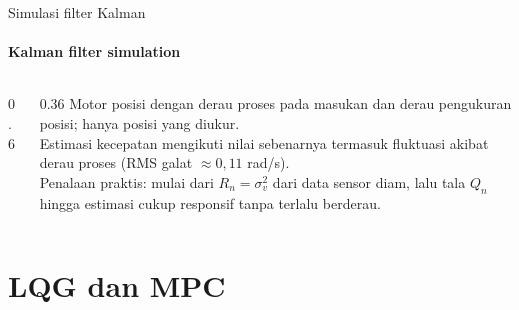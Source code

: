 \documentclass[aspectratio=169,10pt]{beamer}
\begin{document}
\begin{frame}{Simulasi filter Kalman}
	\framesubtitle{Kalman filter simulation}
	\begin{columns}[c]
		\begin{column}{0.6\textwidth}
			\centering
		\end{column}
		\begin{column}{0.36\textwidth}
			\small
			Motor posisi dengan derau proses pada masukan dan derau pengukuran posisi; hanya posisi yang diukur.\\[4pt]
			Estimasi kecepatan mengikuti nilai sebenarnya termasuk fluktuasi akibat derau proses (RMS galat $\approx 0{,}11$ rad/s).\\[4pt]
			{\scriptsize Penalaan praktis: mulai dari $R_n = \sigma_v^2$ dari data sensor diam, lalu tala $Q_n$ hingga estimasi cukup responsif tanpa terlalu berderau.}
		\end{column}
	\end{columns}
\end{frame}

\section{LQG dan MPC\texorpdfstring{\\[4pt]{\Large{}}}{ / LQG and MPC}}
\end{document}
